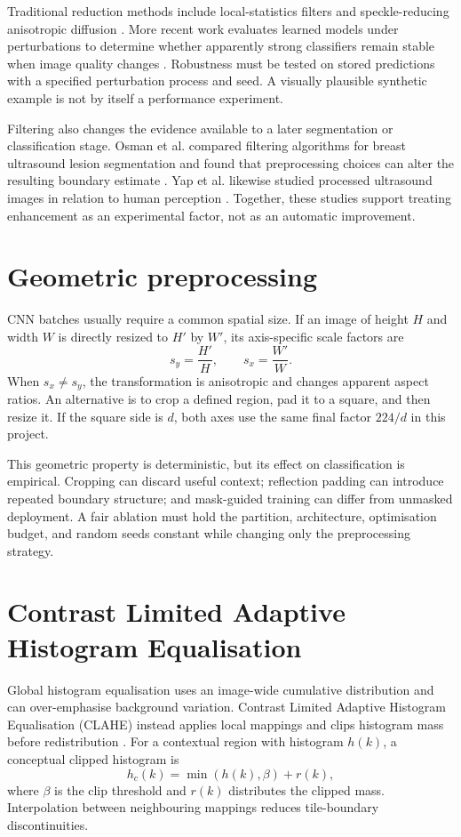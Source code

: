 Traditional reduction methods include local-statistics filters and speckle-reducing anisotropic diffusion \citep{Lee1980,Yu2002}. More recent work evaluates learned models under perturbations to determine whether apparently strong classifiers remain stable when image quality changes \citep{Jiang2023}. Robustness must be tested on stored predictions with a specified perturbation process and seed. A visually plausible synthetic example is not by itself a performance experiment.

Filtering also changes the evidence available to a later segmentation or classification stage. Osman et al. compared filtering algorithms for breast ultrasound lesion segmentation and found that preprocessing choices can alter the resulting boundary estimate \citep{Osman2018}. Yap et al. likewise studied processed ultrasound images in relation to human perception \citep{Yap2010}. Together, these studies support treating enhancement as an experimental factor, not as an automatic improvement.

\section{Geometric preprocessing}
CNN batches usually require a common spatial size. If an image of height $H$ and width $W$ is directly resized to $H'$ by $W'$, its axis-specific scale factors are
\begin{equation}
s_y=\frac{H'}{H}, \qquad s_x=\frac{W'}{W}.
\end{equation}
When $s_x\neq s_y$, the transformation is anisotropic and changes apparent aspect ratios. An alternative is to crop a defined region, pad it to a square, and then resize it. If the square side is $d$, both axes use the same final factor $224/d$ in this project.

This geometric property is deterministic, but its effect on classification is empirical. Cropping can discard useful context; reflection padding can introduce repeated boundary structure; and mask-guided training can differ from unmasked deployment. A fair ablation must hold the partition, architecture, optimisation budget, and random seeds constant while changing only the preprocessing strategy.

\section{Contrast Limited Adaptive Histogram Equalisation}
Global histogram equalisation uses an image-wide cumulative distribution and can over-emphasise background variation. Contrast Limited Adaptive Histogram Equalisation (CLAHE) instead applies local mappings and clips histogram mass before redistribution \citep{Zuiderveld1994}. For a contextual region with histogram $h(k)$, a conceptual clipped histogram is
\begin{equation}
h_c(k)=\min(h(k),\beta)+r(k),
\end{equation}
where $\beta$ is the clip threshold and $r(k)$ distributes the clipped mass. Interpolation between neighbouring mappings reduces tile-boundary discontinuities.

